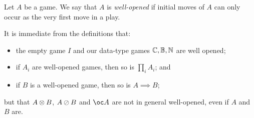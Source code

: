 \documentclass[11pt]{report}
\begin{document}
\begin{definition}
  Let $A$ be a game.  
  We say that $A$ is \emph{well-opened} if initial moves of $A$ can only occur as the very first move in a play.
\end{definition}

It is immediate from the definitions that:
\begin{itemize}
  \item the empty game $I$ and our data-type games $\mathbb{C},\mathbb{B},\mathbb{N}$ are well opened;
  \item if $A_i$ are well-opened games, then so is $\prod_iA_i$; and
  \item if $B$ is a well-opened game, then so is $A \implies B$;
\end{itemize}
but that $A \otimes B$, $A\oslash B$ and $\oc A$ are not in general well-opened, even if $A$ and $B$ are.
\end{document}
